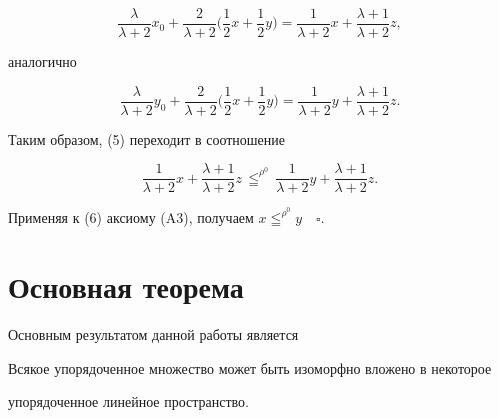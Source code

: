$$ 


\frac{\lambda}{\lambda+2}x_0+\frac{2}{\lambda+2} 


\biggl(\frac{1}{2}x+\frac{1}{2}y\biggr)= 


\frac{1}{\lambda+2}x+\frac{\lambda+1}{\lambda+2}z, 


$$ 


аналогично 


$$ 


\frac{\lambda}{\lambda+2}y_0+\frac{2}{\lambda+2} 


\biggl(\frac{1}{2}x+\frac{1}{2}y\biggr)= 


\frac{1}{\lambda+2}y+\frac{\lambda+1}{\lambda+2}z. 


$$ 


Таким образом, (5) переходит в соотношение 


\begin{equation} 


\frac{1}{\lambda+2}x+\frac{\lambda+1}{\lambda+2}z\, 


\leqq^{\rho^0}\,\frac{1}{\lambda+2}y+ 


\frac{\lambda+1}{\lambda+2}z. 


\end{equation} 


Применяя к (6) аксиому (A3), получаем $x\leqq^{\rho^0}y\quad\square$. 


 


\section{Основная теорема} 


 


Основным результатом данной работы является 


 


\begin{thm} 


Всякое упорядоченное множество может быть изоморфно вложено в некоторое 


упорядоченное линейное пространство. 


\end{thm} 


 


